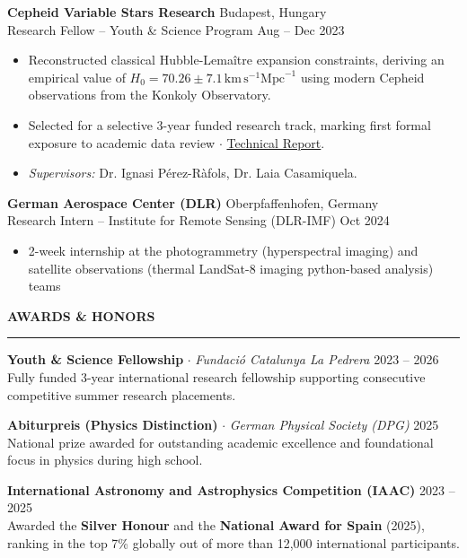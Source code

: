 \documentclass[10pt,a4paper]{article}
\newcommand{\cvsection}[1]{%
    \vspace{14pt}
    {\large\bfseries\MakeUppercase{#1}}
    \vspace{2pt}\hrule\vspace{6pt}
}
\begin{document}
\textbf{Cepheid Variable Stars Research} \hfill Budapest, Hungary \\
Research Fellow -- Youth \& Science Program \hfill Aug -- Dec 2023
\begin{itemize}
    \itemsep0em 
    \item Reconstructed classical Hubble-Lemaître expansion constraints, deriving an empirical value of $H_0 = 70.26 \pm 7.1 \, \text{km} \, \text{s}^{-1} \text{Mpc}^{-1}$ using modern Cepheid observations from the Konkoly Observatory.
    \item Selected for a selective 3-year funded research track, marking first formal exposure to academic data review $\cdot$ \href{https://joanalnu.github.io/files/Paper2023_RecomputingTheHubbleConstant.pdf}{Technical Report}.
    \item \textit{Supervisors:} Dr. Ignasi Pérez-Ràfols, Dr. Laia Casamiquela.
\end{itemize}

\textbf{German Aerospace Center (DLR)} \hfill Oberpfaffenhofen, Germany \\
Research Intern -- Institute for Remote Sensing (DLR-IMF) \hfill Oct 2024
\begin{itemize}
    \itemsep0em 
    \item 2-week internship at the photogrammetry (hyperspectral imaging) and satellite observations (thermal LandSat-8 imaging python-based analysis) teams
\end{itemize}

\cvsection{Awards \& Honors}

\textbf{Youth \& Science Fellowship} $\cdot$ \textit{Fundació Catalunya La Pedrera} \hfill 2023 -- 2026 \\
Fully funded 3-year international research fellowship supporting consecutive competitive summer research placements.

\vspace{4pt}

\textbf{Abiturpreis (Physics Distinction)} $\cdot$ \textit{German Physical Society (DPG)} \hfill 2025 \\
National prize awarded for outstanding academic excellence and foundational focus in physics during high school.

\vspace{4pt}

\textbf{International Astronomy and Astrophysics Competition (IAAC)} \hfill 2023 -- 2025 \\
Awarded the \textbf{Silver Honour} and the \textbf{National Award for Spain} (2025), ranking in the top 7\% globally out of more than 12,000 international participants.
\end{document}
